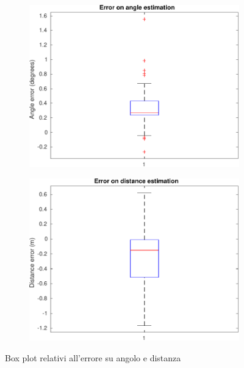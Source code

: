 \documentclass[a4paper]{article}
\begin{document}
	\begin{figure}[ht]
		\begin{subfigure}{.49\textwidth}
			\centering
			\includegraphics[width=1\linewidth]{./img/angle_error.pdf}  
			\label{fig:angle_plot}
		\end{subfigure}
		\begin{subfigure}{.49\textwidth}
			\centering
			\includegraphics[width=1\linewidth]{./img/distance_error.pdf}  
			\label{fig:distance_plot}
		\end{subfigure}
		\caption{Box plot relativi all'errore su angolo e distanza}
		\label{fig:boxes_plot}
	\end{figure}
\end{document}
